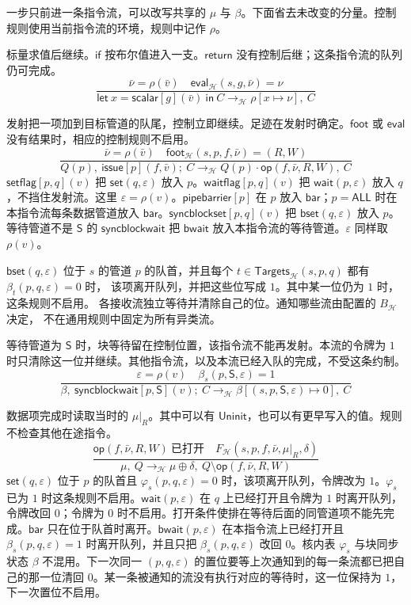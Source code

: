 \documentclass[UTF8,a4paper,11pt,fontset=fandol]{ctexart}
\newcommand{\kw}[1]{\ensuremath{\mathsf{#1}}}
\newcommand{\infer}[2]{\displaystyle\frac{\displaystyle #1}{\displaystyle #2}}
\begin{document}
一步只前进一条指令流，可以改写共享的 $\mu$ 与 $\beta$。下面省去未改变的分量。控制规则使用当前指令流的环境，规则中记作 $\rho$。

标量求值后继续。$\kw{if}$ 按布尔值进入一支。$\kw{return}$ 没有控制后继；这条指令流的队列仍可完成。
\[
\infer{
  \bar\nu=\rho(\bar v)
  \quad
  \mathsf{eval}_{\mathcal H}(s,g,\bar\nu)=\nu
}{
  \kw{let}\ x=\kw{scalar}[g](\bar v)\ \kw{in}\ C
  \longrightarrow_{\mathcal H}
  \rho[x\mapsto\nu],\ C
}
\]

发射把一项加到目标管道的队尾，控制立即继续。足迹在发射时确定。$\mathsf{foot}$ 或 $\mathsf{eval}$ 没有结果时，相应的控制规则不启用。
\[
\infer{
  \bar\nu=\rho(\bar v)
  \quad
  \mathsf{foot}_{\mathcal H}(s,p,f,\bar\nu)=(R,W)
}{
  Q(p),\ 
  \kw{issue}[p](f,\bar v);\ C
  \longrightarrow_{\mathcal H}
  Q(p){\cdot}\kw{op}(f,\bar\nu,R,W),\
  C
}
\]
$\kw{setflag}[p,q](v)$ 把 $\kw{set}(q,\varepsilon)$ 放入 $p$。$\kw{waitflag}[p,q](v)$ 把 $\kw{wait}(p,\varepsilon)$ 放入 $q$，不挡住发射流。这里 $\varepsilon=\rho(v)$。$\kw{pipebarrier}[p]$ 在 $p$ 放入 $\kw{bar}$；$p=\mathsf{ALL}$ 时在本指令流每条数据管道放入 $\kw{bar}$。$\kw{syncblockset}[p,q](v)$ 把 $\kw{bset}(q,\varepsilon)$ 放入 $p$。等待管道不是 $\mathsf{S}$ 的 $\kw{syncblockwait}$ 把 $\kw{bwait}$ 放入本指令流的等待管道。$\varepsilon$ 同样取 $\rho(v)$。

$\kw{bset}(q,\varepsilon)$ 位于 $s$ 的管道 $p$ 的队首，并且每个
$t\in\mathsf{Targets}_{\mathcal H}(s,p,q)$ 都有 $\beta_t(p,q,\varepsilon)=0$ 时，
该项离开队列，并把这些位写成 $1$。其中某一位仍为 $1$ 时，这条规则不启用。
各接收流独立等待并清除自己的位。通知哪些流由配置的 $B_{\mathcal H}$ 决定，
不在通用规则中固定为所有异类流。

等待管道为 $\mathsf{S}$ 时，块等待留在控制位置，该指令流不能再发射。本流的令牌为 $1$ 时只清除这一位并继续。其他指令流，以及本流已经入队的完成，不受这条约制。
\[
\infer{
  \varepsilon=\rho(v)
  \quad
  \beta_s(p,\mathsf{S},\varepsilon)=1
}{
  \beta,\ 
  \kw{syncblockwait}[p,\mathsf{S}](v);\ C
  \longrightarrow_{\mathcal H}
  \beta[(s,p,\mathsf{S},\varepsilon)\mapsto 0],\ 
  C
}
\]

数据项完成时读取当时的 $\mu|_R$。其中可以有 $\mathsf{Uninit}$，也可以有更早写入的值。规则不检查其他在途指令。
\[
\infer{
  \kw{op}(f,\bar\nu,R,W)\ \text{已打开}
  \quad
  F_{\mathcal H}(s,p,f,\bar\nu,\mu|_R,\delta)
}{
  \mu,\ Q
  \longrightarrow_{\mathcal H}
  \mu\oplus\delta,\ Q\setminus\kw{op}(f,\bar\nu,R,W)
}
\]
$\kw{set}(q,\varepsilon)$ 位于 $p$ 的队首且 $\varphi_s(p,q,\varepsilon)=0$ 时，该项离开队列，令牌改为 $1$。$\varphi_s$ 已为 $1$ 时这条规则不启用。$\kw{wait}(p,\varepsilon)$ 在 $q$ 上已经打开且令牌为 $1$ 时离开队列，令牌改回 $0$；令牌为 $0$ 时不启用。打开条件使排在等待后面的同管道项不能先完成。$\kw{bar}$ 只在位于队首时离开。$\kw{bwait}(p,\varepsilon)$ 在本指令流上已经打开且 $\beta_s(p,q,\varepsilon)=1$ 时离开队列，并且只把 $\beta_s(p,q,\varepsilon)$ 改回 $0$。核内表 $\varphi_s$ 与块同步状态 $\beta$ 不混用。下一次同一 $(p,q,\varepsilon)$ 的置位要等上次通知到的每一条流都已把自己的那一位清回 $0$。某一条被通知的流没有执行对应的等待时，这一位保持为 $1$，下一次置位不启用。
\end{document}

